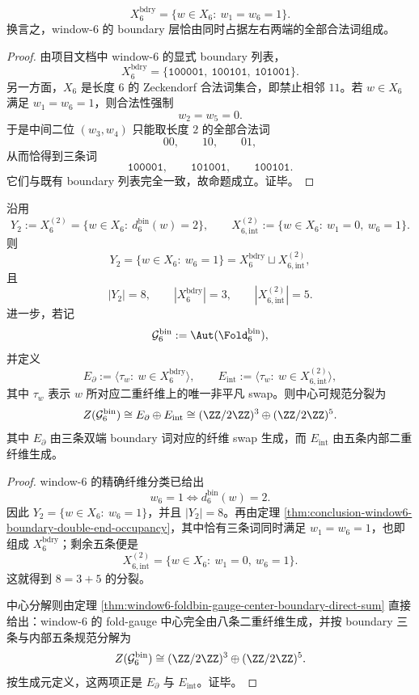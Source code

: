 \begin{theorem}\label{thm:conclusion-window6-boundary-double-end-occupancy}
\[
X_6^{\mathrm{bdry}}
=
\{w\in X_6:\ w_1=w_6=1\}.
\]
换言之，window-\(6\) 的 boundary 层恰由同时占据左右两端的全部合法词组成。
\end{theorem}
\begin{proof}
由项目文档中 window-\(6\) 的显式 boundary 列表，
\[
X_6^{\mathrm{bdry}}
=
\{\texttt{100001},\ \texttt{100101},\ \texttt{101001}\}.
\]
另一方面，\(X_6\) 是长度 \(6\) 的 Zeckendorf 合法词集合，即禁止相邻 \(11\)。若 \(w\in X_6\) 满足 \(w_1=w_6=1\)，则合法性强制
\[
w_2=w_5=0.
\]
于是中间二位 \((w_3,w_4)\) 只能取长度 \(2\) 的全部合法词
\[
00,\qquad 10,\qquad 01,
\]
从而恰得到三条词
\[
\texttt{100001},\qquad \texttt{101001},\qquad \texttt{100101}.
\]
它们与既有 boundary 列表完全一致，故命题成立。证毕。
\end{proof}

\begin{corollary}\label{cor:conclusion-window6-twofiber-boundary-internal-splitting}
沿用
\[
Y_2:=X_6^{(2)}=\{w\in X_6:\ d_6^{\mathrm{bin}}(w)=2\},
\qquad
X_{6,\mathrm{int}}^{(2)}:=\{w\in X_6:\ w_1=0,\ w_6=1\}.
\]
则
\[
Y_2
=
\{w\in X_6:\ w_6=1\}
=
X_6^{\mathrm{bdry}}\sqcup X_{6,\mathrm{int}}^{(2)},
\]
且
\[
|Y_2|=8,\qquad |X_6^{\mathrm{bdry}}|=3,\qquad |X_{6,\mathrm{int}}^{(2)}|=5.
\]
进一步，若记
\[
\mathcal G_6^{\mathrm{bin}}:=\Aut(\Fold_6^{\mathrm{bin}}),
\]
并定义
\[
E_{\partial}:=\langle \tau_w:\ w\in X_6^{\mathrm{bdry}}\rangle,
\qquad
E_{\mathrm{int}}:=\langle \tau_w:\ w\in X_{6,\mathrm{int}}^{(2)}\rangle,
\]
其中 \(\tau_w\) 表示 \(w\) 所对应二重纤维上的唯一非平凡 swap。则中心可规范分裂为
\[
Z(\mathcal G_6^{\mathrm{bin}})
\cong
E_{\partial}\oplus E_{\mathrm{int}}
\cong
(\ZZ/2\ZZ)^3\oplus(\ZZ/2\ZZ)^5.
\]
其中 \(E_{\partial}\) 由三条双端 boundary 词对应的纤维 swap 生成，而 \(E_{\mathrm{int}}\) 由五条内部二重纤维生成。
\end{corollary}
\begin{proof}
window-\(6\) 的精确纤维分类已给出
\[
w_6=1
\Longleftrightarrow
d_6^{\mathrm{bin}}(w)=2.
\]
因此 \(Y_2=\{w\in X_6:\ w_6=1\}\)，并且 \(|Y_2|=8\)。再由定理 \ref{thm:conclusion-window6-boundary-double-end-occupancy}，其中恰有三条词同时满足 \(w_1=w_6=1\)，也即组成 \(X_6^{\mathrm{bdry}}\)；剩余五条便是
\[
X_{6,\mathrm{int}}^{(2)}=\{w\in X_6:\ w_1=0,\ w_6=1\}.
\]
这就得到 \(8=3+5\) 的分裂。

中心分解则由定理 \ref{thm:window6-foldbin-gauge-center-boundary-direct-sum} 直接给出：window-\(6\) 的 fold-gauge 中心完全由八条二重纤维生成，并按 boundary 三条与内部五条规范分解为
\[
Z(\mathcal G_6^{\mathrm{bin}})
\cong
(\ZZ/2\ZZ)^3\oplus(\ZZ/2\ZZ)^5.
\]
按生成元定义，这两项正是 \(E_{\partial}\) 与 \(E_{\mathrm{int}}\)。证毕。
\end{proof}

